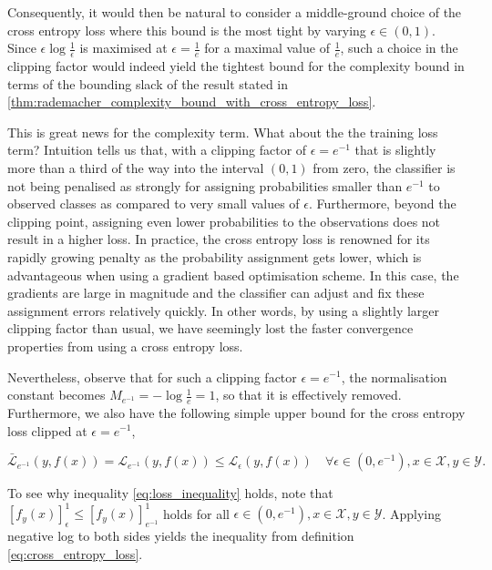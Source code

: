 \documentclass{article}
\begin{document}
		Consequently, it would then be natural to consider a middle-ground choice of the cross entropy loss where this bound is the most tight by varying $\epsilon \in (0, 1)$. Since $\epsilon \log{\frac{1}{\epsilon}}$ is maximised at $\epsilon = \frac{1}{e}$ for a maximal value of $\frac{1}{e}$, such a choice in the clipping factor would indeed yield the tightest bound for the complexity bound in terms of the bounding slack of the result stated in \cref{thm:rademacher_complexity_bound_with_cross_entropy_loss}.
		 
		This is great news for the complexity term. What about the the training loss term? Intuition tells us that, with a clipping factor of $\epsilon = e^{-1}$ that is slightly more than a third of the way into the interval $(0, 1)$ from zero, the classifier is not being penalised as strongly for assigning probabilities smaller than $e^{-1}$ to observed classes as compared to very small values of $\epsilon$. Furthermore, beyond the clipping point, assigning even lower probabilities to the observations does not result in a higher loss. In practice, the cross entropy loss is renowned for its rapidly growing penalty as the probability assignment gets lower, which is advantageous when using a gradient based optimisation scheme. In this case, the gradients are large in magnitude and the classifier can adjust and fix these assignment errors relatively quickly. In other words, by using a slightly larger clipping factor than usual, we have seemingly lost the faster convergence properties from using a cross entropy loss.
		
		Nevertheless, observe that for such a clipping factor $\epsilon = e^{-1}$, the normalisation constant becomes $M_{e^{-1}} = - \log{\frac{1}{e}} = 1$, so that it is effectively removed. Furthermore, we also have the following simple upper bound for the cross entropy loss clipped at $\epsilon = e^{-1}$,
		
		\begin{equation}
			\bar{\mathcal{L}}_{e^{-1}}(y, f(x)) = \mathcal{L}_{e^{-1}}(y, f(x)) \leq \mathcal{L}_{\epsilon}(y, f(x)) \quad \forall \epsilon \in (0, e^{-1}), x \in \mathcal{X}, y \in \mathcal{Y}.
		\label{eq:loss_inequality}
		\end{equation}
		
		
		To see why inequality \eqref{eq:loss_inequality} holds, note that $[f_{y}(x)]_{\epsilon}^{1} \leq [f_{y}(x)]_{e^{-1}}^{1}$ holds for all $\epsilon \in (0, e^{-1}), x \in \mathcal{X}, y \in \mathcal{Y}$. Applying negative log to both sides yields the inequality from definition \eqref{eq:cross_entropy_loss}.
\end{document}
